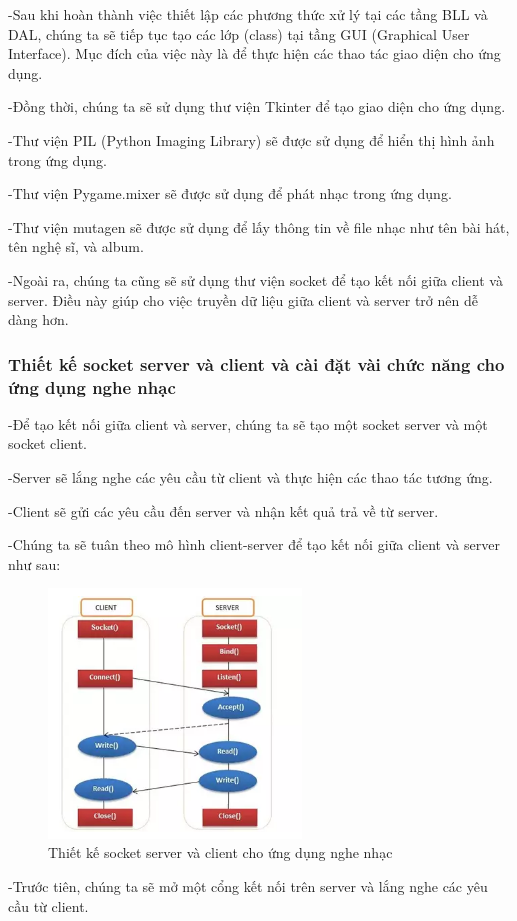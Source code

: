 \documentclass[a4paper]{article}
\begin{document}
\begin{flushleft}
	-Sau khi hoàn thành việc thiết lập các phương thức xử lý tại các tầng BLL và DAL,
	chúng ta sẽ tiếp tục tạo các lớp (class) tại tầng GUI (Graphical User Interface). Mục đích của việc này là để thực hiện các thao tác giao diện cho ứng dụng.

	-Đồng thời, chúng ta sẽ sử dụng thư viện Tkinter để tạo giao diện cho ứng dụng.

	-Thư viện PIL (Python Imaging Library) sẽ được sử dụng để hiển thị hình ảnh trong ứng dụng.

	-Thư viện Pygame.mixer sẽ được sử dụng để phát nhạc trong ứng dụng.

	-Thư viện mutagen sẽ được sử dụng để lấy thông tin về file nhạc như tên bài hát, tên nghệ sĩ, và album.

	-Ngoài ra, chúng ta cũng sẽ sử dụng thư viện socket để tạo kết nối giữa client và server.
	Điều này giúp cho việc truyền dữ liệu giữa client và server trở nên dễ dàng hơn.

	\subsubsection{Thiết kế socket server và client và cài đặt vài chức năng cho ứng dụng nghe nhạc}
	\begin{flushleft}
		-Để tạo kết nối giữa client và server, chúng ta sẽ tạo một socket server và một socket client.

		-Server sẽ lắng nghe các yêu cầu từ client và thực hiện các thao tác tương ứng.

		-Client sẽ gửi các yêu cầu đến server và nhận kết quả trả về từ server.

		-Chúng ta sẽ tuân theo mô hình client-server để tạo kết nối giữa client và server như sau:
		\begin{figure}[h]
			\centering
			\includegraphics[width=0.6\textwidth]{images/socket-establishment.png}
			\caption{Thiết kế socket server và client cho ứng dụng nghe nhạc}
		\end{figure}

		-Trước tiên, chúng ta sẽ mở một cổng kết nối trên server và lắng nghe các yêu cầu từ client.
	\end{flushleft}
\end{flushleft}
\end{document}
